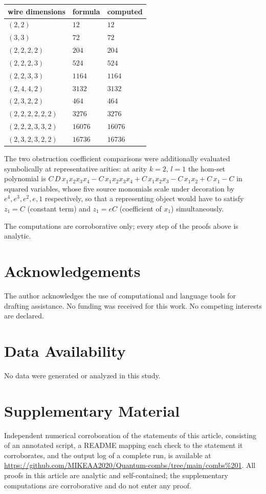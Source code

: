 \documentclass[11pt,a4paper]{article}
\theoremstyle{definition}
\theoremstyle{plain}
\theoremstyle{remark}
\begin{document}
\begin{center}
\begin{tabular}{lll}
wire dimensions & formula & computed \\
\hline
$(2,2)$ & $12$ & $12$\\
$(3,3)$ & $72$ & $72$\\
$(2,2,2,2)$ & $204$ & $204$\\
$(2,2,2,3)$ & $524$ & $524$\\
$(2,2,3,3)$ & $1164$ & $1164$\\
$(2,4,4,2)$ & $3132$ & $3132$\\
$(2,3,2,2)$ & $464$ & $464$\\
$(2,2,2,2,2,2)$ & $3276$ & $3276$\\
$(2,2,2,3,3,2)$ & $16076$ & $16076$\\
$(2,3,2,3,2,2)$ & $16736$ & $16736$
\end{tabular}
\end{center}

The two obstruction coefficient comparisons were additionally evaluated
symbolically at representative arities: at arity $k=2$, $l=1$ the hom-set
polynomial is
$C\,D\,x_1x_2x_3x_4-C\,x_1x_2x_3x_4+C\,x_1x_2x_3-C\,x_1x_2+C\,x_1-C$ in
squared variables, whose five source monomials scale under decoration by
$e^4,e^3,e^2,e,1$ respectively, so that a representing object would have to
satisfy $z_1=C$ (constant term) and $z_1=eC$ (coefficient of $x_1$)
simultaneously.

The computations are corroborative only; every step of the proofs above is
analytic.

\section*{Acknowledgements}
The author acknowledges the use of computational and language tools for drafting assistance. No funding was received for this work. No competing interests are declared.

\section*{Data Availability}
No data were generated or analyzed in this study.

\section*{Supplementary Material}
Independent numerical corroboration of the statements of this article,
consisting of an annotated script, a README mapping each check to the
statement it corroborates, and the output log of a complete run, is
available at \url{https://github.com/MIKEAA2020/Quantum-combs/tree/main/combs%201}.
All proofs in this article are analytic and self-contained; the
supplementary computations are corroborative and do not enter any proof.
\end{document}
